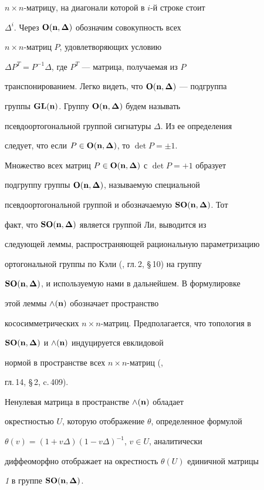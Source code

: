 $n\times n$-матрицу, на диагонали которой в $i$-й строке стоит


$\Delta^i$. Через $\bold{O(n,\boldsymbol\Delta)}$ обозначим совокупность всех


$n\times n$-матриц $P$, удовлетворяющих условию


$\Delta P^T=P^{-1}\Delta$, где $P^T$ --- матрица, получаемая из $P$


транспонированием. Легко видеть, что $\bold{O(n,\boldsymbol\Delta)}$ --- подгруппа


группы $\bold{GL(n)}$. Группу $\bold{O(n,\boldsymbol\Delta)}$ будем называть


псевдоортогональной группой сигнатуры $\Delta$. Из ее определения


следует, что если $P\in{\bold{O(n,\boldsymbol\Delta)}}$, то $\det P=\pm 1$.


Множество всех матриц $P\in{\bold{O(n,\boldsymbol\Delta)}}$ с $\det P=+1$ образует


подгруппу группы $\bold{O(n,\boldsymbol\Delta)}$, называемую специальной


псевдоортогональной группой и обозначаемую $\bold{SO(n,\boldsymbol\Delta)}$. Тот


факт, что $\bold{SO(n,\boldsymbol\Delta)}$ является группой Ли, выводится из


следующей леммы, распространяющей рациональную параметризацию


ортогональной группы по Кэли (\cite{Weyl}, гл.\,2, \S\,10) на группу


$\bold{SO(n,\boldsymbol\Delta)}$, и используемую нами в дальнейшем. В формулировке


этой леммы ${\wedge(\bf n)}$ обозначает пространство


кососимметрических $n\times n$-матриц. Предполагается, что топология в


$\bold{SO(n,\boldsymbol\Delta)}$ и ${\wedge(\bf n)}$ индуцируется евклидовой


нормой в пространстве всех $n\times n$-матриц (\cite{Gan},


гл.\,14, \S\,2, c.\,409).





\begin{lem}


Ненулевая матрица в пространстве ${\wedge(\bf n)}$ обладает


окрестностью $U$, которую отображение $\theta$, определенное формулой


$\theta(v)=(1+v\Delta)(1-v\Delta)^{-1}$, $v\in U$, аналитически


диффеоморфно отображает на окрестность $\theta(U)$ единичной матрицы


{\em 1} в группе $\bold{SO(n,\boldsymbol\Delta)}$.


\end{lem}





